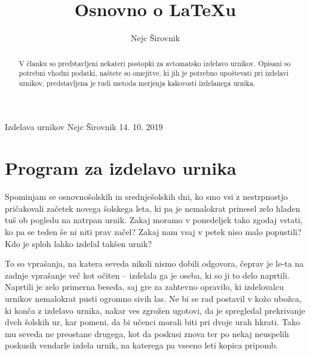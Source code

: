 \documentclass[a4paper,10pt]{article}
\begin{document}
\title{Osnovno o {\LaTeX}u}
\author{Nejc Širovnik}
\maketitle


Izdelava urnikov
Nejc Širovnik
14. 10. 2019


\begin{abstract}
   V članku so predstavljeni nekateri postopki za avtomatsko izdelavo urnikov. Opisani so
   potrebni vhodni podatki, naštete so omejitve, ki jih je potrebno upoštevati pri izdelavi
   urnikov, predstavljena je tudi metoda merjenja kakovosti izdelanega urnika.
\end{abstract}

\section{Program za izdelavo urnika }

Spominjam se osnovnošolskih in srednješolskih dni, ko smo vsi z nestrpnostjo pričakovali
začetek novega šolskega leta, ki pa je nemalokrat prinesel zelo hladen tuš ob pogledu na
natrpan urnik. Zakaj moramo v ponedeljek tako zgodaj vstati, ko pa se teden še ni niti
prav začel? Zakaj nam vsaj v petek niso malo popustili? Kdo je sploh lahko izdelal
takšen urnik?

To so vprašanja, na katera seveda nikoli nismo dobili odgovora, čeprav je le-ta na zadnje
vprašanje več kot očiten -- izdelala ga je oseba, ki so ji to delo naprtili. Naprtili je
zelo primerna beseda, saj gre za zahtevno opravilo, ki izdelovalcu urnikov nemalokrat
pusti ogromno sivih las. Ne bi se rad postavil v kožo ubožca, ki konča z izdelavo urnika,
nakar ves zgrožen ugotovi, da je spregledal prekrivanje dveh šolskih ur, kar pomeni, da
bi učenci morali biti pri dvoje urah hkrati. Tako mu seveda ne preostane drugega, kot da
poskusi znova ter po nekaj neuspelih poskusih vendarle izdela urnik, na katerega pa vseeno
leti kopica pripomb.
\end{document}

